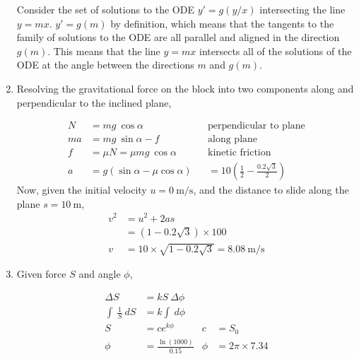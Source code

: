 \begin{enumerate}
          Consider the set of solutions to the ODE $ y' = g(y/x) $ intersecting
          the line $ y = mx $. $ y' = g(m) $ by definition, which means that the tangents
          to the family of solutions to the ODE are all parallel and aligned in the direction
          $ g(m) $. This means that the line $ y = mx $ intersects all of the solutions of the
          ODE at the angle between the directions $ m $ and $ g(m) $.

    \item Resolving the gravitational force on the block into two components along and
          perpendicular to the inclined plane,

          \begin{align}
              N  & = mg\ \cos \alpha                  &  & \text{perpendicular to plane}                         \\
              ma & = mg\ \sin \alpha - f              &  & \text{along plane}                                    \\
              f  & = \mu N = \mu mg\ \cos \alpha      &  & \text{kinetic friction}                               \\
              a  & = g(\sin \alpha - \mu \cos \alpha) &  & = 10 \left(\frac{1}{2} - \frac{0.2\sqrt{3}}{2}\right)
          \end{align}
          Now, given the initial velocity $ u = \SI{0}{\meter\per\second} $, and the
          distance to slide along the plane $ s = \SI{10}{\meter} $,
          \begin{align}
              v^{2} & = u^{2} + 2as                                                      \\
                    & = (1 - 0.2 \sqrt{3}) \times 100                                    \\
              v     & = 10 \times \sqrt{1 - 0.2 \sqrt{3}} = \SI{8.08}{\meter\per\second}
          \end{align}


    \item Given force $ S $ and angle $ \phi $,

          \begin{align}
              \Delta S              & = kS\ \Delta \phi                                     \\
              \int\ \frac{1}{S}\ dS & = k \int\ d\phi                                       \\
              S                     & = ce^{k\phi}              & c    & = S_{0}            \\
              \phi                  & = \frac{\ln (1000)}{0.15} & \phi & = 2\pi \times 7.34
          \end{align}


\end{enumerate}
